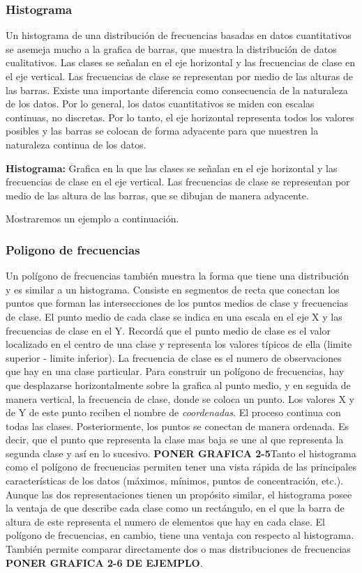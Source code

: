 \documentclass[]{article}
\begin{document}
\subsubsection*{Histograma}
Un histograma de una distribución de frecuencias basadas en datos cuantitativos se asemeja mucho a la grafica de barras, que muestra la distribución de datos cualitativos. Las clases se señalan en el eje horizontal y las frecuencias de clase en el eje vertical. Las frecuencias de clase se representan por medio de las alturas de las barras. Existe una importante diferencia como consecuencia de la naturaleza de los datos. Por lo general, los datos cuantitativos se miden con escalas continuas, no discretas. Por lo tanto, el eje horizontal representa todos los valores posibles y las barras se colocan de forma adyacente para que muestren la naturaleza continua de los datos.
\begin{center}
	\textbf{Histograma: }Grafica en la que las clases se señalan en el eje horizontal y las frecuencias de clase en el eje vertical. Las frecuencias de clase se representan por medio de las altura de las barras, que se dibujan de manera adyacente.
\end{center}
Mostraremos un ejemplo a continuación.
\subsubsection*{Poligono de frecuencias}
Un polígono de frecuencias también muestra la forma que tiene una distribución y es similar a un histograma. Consiste en segmentos de recta que conectan los puntos que forman las intersecciones de los puntos medios de clase y frecuencias de clase. El punto medio de cada clase se indica en una escala en el eje X y las frecuencias de clase en el Y. Recordá que el punto medio de clase es el valor localizado en el centro de una clase y representa los valores típicos de ella (limite superior - limite inferior). La frecuencia de clase es el numero de observaciones que hay en una clase particular. Para construir un polígono de frecuencias, hay que desplazarse horizontalmente sobre la grafica al punto medio, y en seguida de manera vertical, la frecuencia de clase, donde se coloca un punto. Los valores X y de Y de este punto reciben el nombre de \textit{coordenadas}. El proceso continua con todas las clases. Posteriormente, los puntos se conectan de manera ordenada. Es decir, que el punto que representa la clase mas baja se une al que representa la segunda clase y así en lo sucesivo. \textbf{PONER GRAFICA 2-5}\linebreak Tanto el histograma como el polígono de frecuencias permiten tener una vista rápida de las principales características de los datos (máximos, mínimos, puntos de concentración, etc.). Aunque las dos representaciones tienen un propósito similar, el histograma posee la ventaja de que describe cada clase como un rectángulo, en el que la barra de altura de este representa el numero de elementos que hay en cada clase. El polígono de frecuencias, en cambio, tiene una ventaja con respecto al histograma. También permite comparar directamente dos o mas distribuciones de frecuencias \textbf{PONER GRAFICA 2-6 DE EJEMPLO}.
\end{document}
